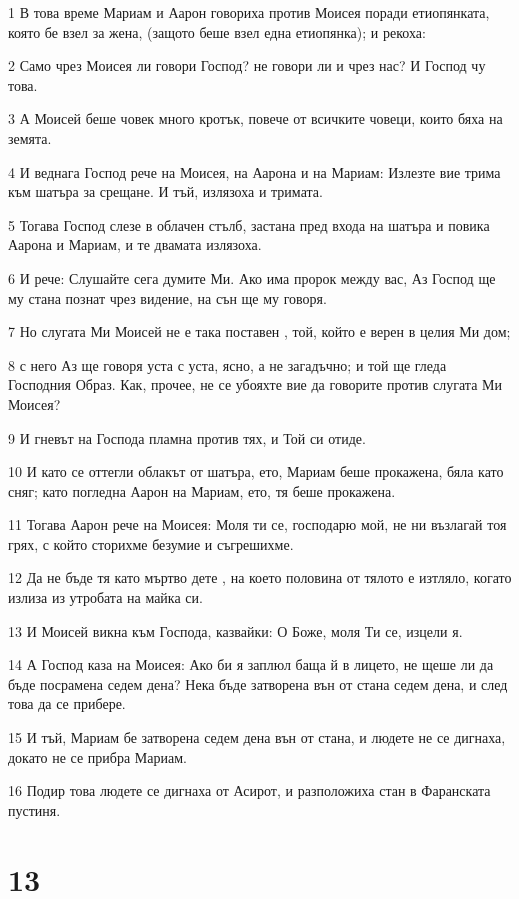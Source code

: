 \par 1 В това време Мариам и Аарон говориха против Моисея поради етиопянката, която бе взел за жена, (защото беше взел една етиопянка); и рекоха:
\par 2 Само чрез Моисея ли говори Господ? не говори ли и чрез нас? И Господ чу това.
\par 3 А Моисей беше човек много кротък, повече от всичките човеци, които бяха на земята.
\par 4 И веднага Господ рече на Моисея, на Аарона и на Мариам: Излезте вие трима към шатъра за срещане. И тъй, излязоха и тримата.
\par 5 Тогава Господ слезе в облачен стълб, застана пред входа на шатъра и повика Аарона и Мариам, и те двамата излязоха.
\par 6 И рече: Слушайте сега думите Ми. Ако има пророк между вас, Аз Господ ще му стана познат чрез видение, на сън ще му говоря.
\par 7 Но слугата Ми Моисей не е така поставен , той, който е верен в целия Ми дом;
\par 8 с него Аз ще говоря уста с уста, ясно, а не загадъчно; и той ще гледа Господния Образ. Как, прочее, не се убояхте вие да говорите против слугата Ми Моисея?
\par 9 И гневът на Господа пламна против тях, и Той си отиде.
\par 10 И като се оттегли облакът от шатъра, ето, Мариам беше прокажена, бяла като сняг; като погледна Аарон на Мариам, ето, тя беше прокажена.
\par 11 Тогава Аарон рече на Моисея: Моля ти се, господарю мой, не ни възлагай тоя грях, с който сторихме безумие и съгрешихме.
\par 12 Да не бъде тя като мъртво дете , на което половина от тялото е изтляло, когато излиза из утробата на майка си.
\par 13 И Моисей викна към Господа, казвайки: О Боже, моля Ти се, изцели я.
\par 14 А Господ каза на Моисея: Ако би я заплюл баща й в лицето, не щеше ли да бъде посрамена седем дена? Нека бъде затворена вън от стана седем дена, и след това да се прибере.
\par 15 И тъй, Мариам бе затворена седем дена вън от стана, и людете не се дигнаха, докато не се прибра Мариам.
\par 16 Подир това людете се дигнаха от Асирот, и разположиха стан в Фаранската пустиня.

\chapter{13}

